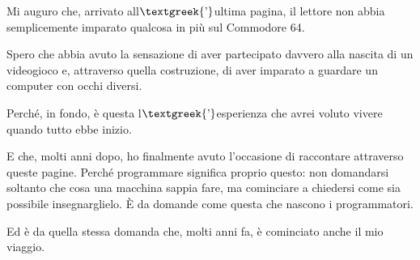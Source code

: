 \documentclass{article}
\begin{document}
Mi auguro che, arrivato all$\text{\textgreek{’}}$ultima pagina, il lettore non abbia semplicemente imparato qualcosa in
più sul Commodore 64.

Spero che abbia avuto la sensazione di aver partecipato davvero alla nascita di un videogioco e, attraverso quella
costruzione, di aver imparato a guardare un computer con occhi diversi.

Perché, in fondo, è questa l$\text{\textgreek{’}}$esperienza che avrei voluto vivere quando tutto ebbe inizio.

E che, molti anni dopo, ho finalmente avuto l'occasione di raccontare attraverso queste pagine. Perché programmare
significa proprio questo: non domandarsi soltanto che cosa una macchina sappia fare, ma cominciare a chiedersi come sia
possibile insegnarglielo. È da domande come questa che nascono i programmatori.

Ed è da quella stessa domanda che, molti anni fa, è cominciato anche il mio viaggio.
\end{document}
